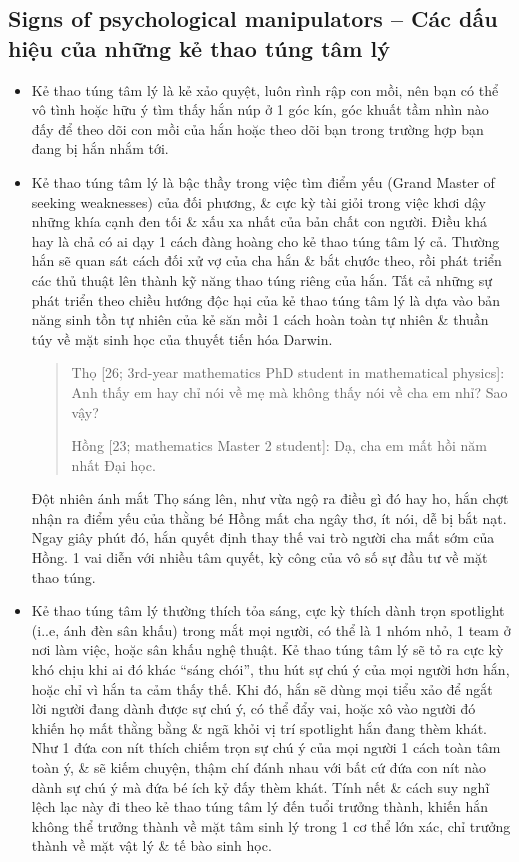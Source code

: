 \documentclass[12pt,twoside]{book}
\begin{document}
\subsection{Signs of psychological manipulators -- Các dấu hiệu của những kẻ thao túng tâm lý}

\begin{itemize}
	\item Kẻ thao túng tâm lý là kẻ xảo quyệt, luôn rình rập con mồi, nên bạn có thể vô tình hoặc hữu ý tìm thấy hắn núp ở 1 góc kín, góc khuất tầm nhìn nào đấy để theo dõi con mồi của hắn hoặc theo dõi bạn trong trường hợp bạn đang bị hắn nhắm tới.
	\item Kẻ thao túng tâm lý là bậc thầy trong việc tìm điểm yếu (Grand Master of seeking weaknesses) của đối phương, \& cực kỳ tài giỏi trong việc khơi dậy những khía cạnh đen tối \& xấu xa nhất của bản chất con người. Điều khá hay là chả có ai dạy 1 cách đàng hoàng cho kẻ thao túng tâm lý cả. Thường hắn sẽ quan sát cách đối xử vợ của cha hắn \& bắt chước theo, rồi phát triển các thủ thuật lên thành kỹ năng thao túng riêng của hắn. Tất cả những sự phát triển theo chiều hướng độc hại của kẻ thao túng tâm lý là dựa vào bản năng sinh tồn tự nhiên của kẻ săn mồi 1 cách hoàn toàn tự nhiên \& thuần túy về mặt sinh học của thuyết tiến hóa Darwin.
	\begin{quote}
		{\sf Thọ [26; 3rd-year mathematics PhD student in mathematical physics]}: Anh thấy em hay chỉ nói về mẹ mà không thấy nói về cha em nhỉ? Sao vậy?
		
		{\sf Hồng [23; mathematics Master 2 student]}: Dạ, cha em mất hồi năm nhất Đại học.
	\end{quote}
	Đột nhiên ánh mắt {\sf Thọ} sáng lên, như vừa ngộ ra điều gì đó hay ho, hắn chợt nhận ra điểm yếu của thằng bé {\sf Hồng} mất cha ngây thơ, ít nói, dễ bị bắt nạt. Ngay giây phút đó, hắn quyết định thay thế vai trò người cha mất sớm của {\sf Hồng}. 1 vai diễn với nhiều tâm quyết, kỳ công của vô số sự đầu tư về mặt thao túng.	
	\item Kẻ thao túng tâm lý thường thích tỏa sáng, cực kỳ thích dành trọn spotlight (i..e, ánh đèn sân khấu) trong mắt mọi người, có thể là 1 nhóm nhỏ, 1 team ở nơi làm việc, hoặc sân khấu nghệ thuật. Kẻ thao túng tâm lý sẽ tỏ ra cực kỳ khó chịu khi ai đó khác ``sáng chói'', thu hút sự chú ý của mọi người hơn hắn, hoặc chỉ vì hắn ta cảm thấy thế. Khi đó, hắn sẽ dùng mọi tiểu xảo để ngắt lời người đang dành được sự chú ý, có thể đẩy vai, hoặc xô vào người đó khiến họ mất thằng bằng \& ngã khỏi vị trí spotlight hắn đang thèm khát. Như 1 đứa con nít thích chiếm trọn sự chú ý của mọi người 1 cách toàn tâm toàn ý, \& sẽ kiếm chuyện, thậm chí đánh nhau với bất cứ đứa con nít nào dành sự chú ý mà đứa bé ích kỷ đấy thèm khát. Tính nết \& cách suy nghĩ lệch lạc này đi theo kẻ thao túng tâm lý đến tuổi trưởng thành, khiến hắn không thể trưởng thành về mặt tâm sinh lý trong 1 cơ thể lớn xác, chỉ trưởng thành về mặt vật lý \& tế bào sinh học.
\end{itemize}
\end{document}
